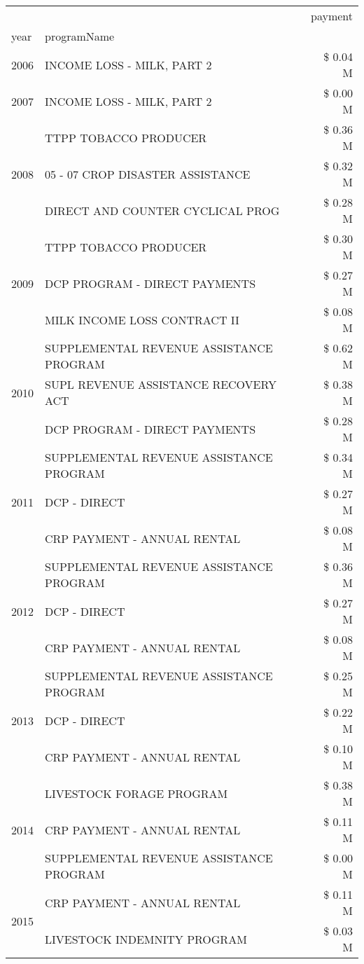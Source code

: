 \begin{tabular}{llr}
\toprule
 &  & payment \\
year & programName &  \\
\midrule
2006 & INCOME LOSS - MILK, PART 2 & \$ 0.04 M \\
\cline{1-3}
2007 & INCOME LOSS - MILK, PART 2 & \$ 0.00 M \\
\cline{1-3}
\multirow[t]{3}{*}{2008} & TTPP TOBACCO PRODUCER & \$ 0.36 M \\
 & 05 - 07 CROP DISASTER ASSISTANCE & \$ 0.32 M \\
 & DIRECT AND COUNTER CYCLICAL PROG & \$ 0.28 M \\
\cline{1-3}
\multirow[t]{3}{*}{2009} & TTPP TOBACCO PRODUCER & \$ 0.30 M \\
 & DCP PROGRAM - DIRECT PAYMENTS & \$ 0.27 M \\
 & MILK INCOME LOSS CONTRACT II & \$ 0.08 M \\
\cline{1-3}
\multirow[t]{3}{*}{2010} & SUPPLEMENTAL REVENUE ASSISTANCE PROGRAM & \$ 0.62 M \\
 & SUPL REVENUE ASSISTANCE RECOVERY ACT & \$ 0.38 M \\
 & DCP PROGRAM - DIRECT PAYMENTS & \$ 0.28 M \\
\cline{1-3}
\multirow[t]{3}{*}{2011} & SUPPLEMENTAL REVENUE ASSISTANCE PROGRAM & \$ 0.34 M \\
 & DCP - DIRECT & \$ 0.27 M \\
 & CRP PAYMENT - ANNUAL RENTAL & \$ 0.08 M \\
\cline{1-3}
\multirow[t]{3}{*}{2012} & SUPPLEMENTAL REVENUE ASSISTANCE PROGRAM & \$ 0.36 M \\
 & DCP - DIRECT & \$ 0.27 M \\
 & CRP PAYMENT - ANNUAL RENTAL & \$ 0.08 M \\
\cline{1-3}
\multirow[t]{3}{*}{2013} & SUPPLEMENTAL REVENUE ASSISTANCE PROGRAM & \$ 0.25 M \\
 & DCP - DIRECT & \$ 0.22 M \\
 & CRP PAYMENT - ANNUAL RENTAL & \$ 0.10 M \\
\cline{1-3}
\multirow[t]{3}{*}{2014} & LIVESTOCK FORAGE PROGRAM & \$ 0.38 M \\
 & CRP PAYMENT - ANNUAL RENTAL & \$ 0.11 M \\
 & SUPPLEMENTAL REVENUE ASSISTANCE PROGRAM & \$ 0.00 M \\
\cline{1-3}
\multirow[t]{3}{*}{2015} & CRP PAYMENT - ANNUAL RENTAL & \$ 0.11 M \\
 & LIVESTOCK INDEMNITY PROGRAM & \$ 0.03 M \\

\end{tabular}

